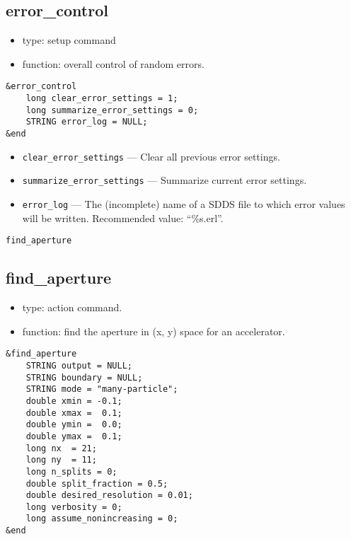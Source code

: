 \documentclass[11pt]{article}
\begin{document}
\subsection{error\_control}

\begin{itemize}
\item type: setup command
\item function: overall control of random errors.
\end{itemize}

\begin{verbatim}
&error_control
    long clear_error_settings = 1;
    long summarize_error_settings = 0;
    STRING error_log = NULL;
&end
\end{verbatim}

\begin{itemize}
\item \verb|clear_error_settings| --- Clear all previous error settings.
\item \verb|summarize_error_settings| --- Summarize current error settings.
\item \verb|error_log| --- The (incomplete) name of a SDDS file to which error values will be written.  Recommended value: ``\%s.erl''.
\end{itemize}

\begin{latexonly}
\newpage
\begin{center}{\Large\verb|find_aperture|}\end{center}
\end{latexonly}
\subsection{find\_aperture}

\begin{itemize}
\item type: action command.
\item function: find the aperture in (x, y) space for an accelerator.
\end{itemize}

\begin{verbatim}
&find_aperture
    STRING output = NULL;
    STRING boundary = NULL;
    STRING mode = "many-particle";
    double xmin = -0.1;
    double xmax =  0.1;
    double ymin =  0.0;
    double ymax =  0.1;
    long nx  = 21;
    long ny  = 11;
    long n_splits = 0;
    double split_fraction = 0.5;
    double desired_resolution = 0.01;
    long verbosity = 0;    
    long assume_nonincreasing = 0;
&end
\end{verbatim}
\end{document}
